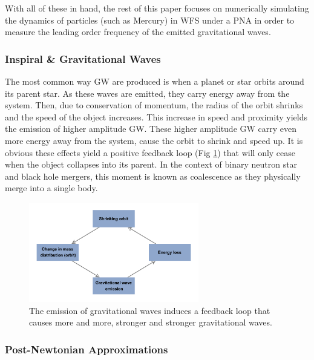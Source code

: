 \documentclass{report}
\begin{document}
            With all of these in hand, the rest of this paper focuses on numerically simulating the dynamics of particles (such as Mercury) in WFS under a PNA in order to measure the leading order frequency of the emitted gravitational waves.

            \subsubsection{Inspiral \& Gravitational Waves}

                The most common way GW are produced is when a planet or star orbits around its parent star.  As these waves are emitted, they carry energy away from the system.  Then, due to conservation of momentum, the radius of the orbit shrinks and the speed of the object increases.  This increase in speed and proximity yields the emission of higher amplitude GW.  These higher amplitude GW carry even more energy away from the system, cause the orbit to shrink and speed up.  It is obvious these effects yield a positive feedback loop (Fig \ref{fig:GW_Loop}) that will only cease when the object collapses into its parent.  In the context of binary neutron star and black hole mergers, this moment is known as coalescence as they physically merge into a single body. 

                \begin{figure}[h]
                    \centering
                    \includegraphics[width=0.66\textwidth]{images/GW_flow_diagram.pdf}
                    \caption{The emission of gravitational waves induces a feedback loop that causes more and more, stronger and stronger gravitational waves.}
                    \label{fig:GW_Loop}
                \end{figure}

            \subsubsection{Post-Newtonian Approximations}
\end{document}
